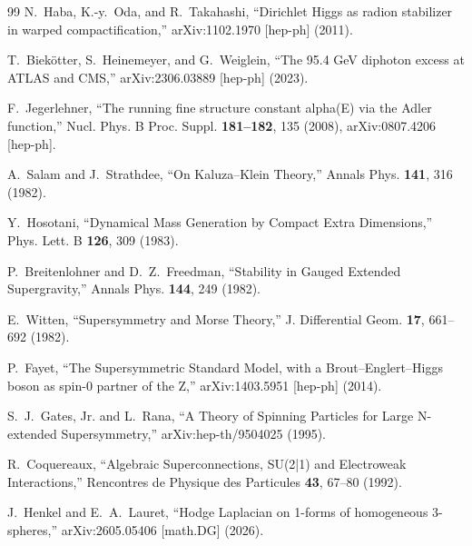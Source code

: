 \begin{thebibliography}{99}
N.~Haba, K.-y.~Oda, and R.~Takahashi, ``Dirichlet Higgs as radion stabilizer in warped compactification,'' arXiv:1102.1970 [hep-ph] (2011).

T.~Biek{\"o}tter, S.~Heinemeyer, and G.~Weiglein, ``The 95.4 GeV diphoton excess at ATLAS and CMS,'' arXiv:2306.03889 [hep-ph] (2023).

F.~Jegerlehner, ``The running fine structure constant alpha(E) via the Adler function,'' Nucl. Phys. B Proc. Suppl. \textbf{181--182}, 135 (2008), arXiv:0807.4206 [hep-ph].

A.~Salam and J.~Strathdee, ``On Kaluza--Klein Theory,'' Annals Phys. \textbf{141}, 316 (1982).

Y.~Hosotani, ``Dynamical Mass Generation by Compact Extra Dimensions,'' Phys. Lett. B \textbf{126}, 309 (1983).

P.~Breitenlohner and D.~Z.~Freedman, ``Stability in Gauged Extended Supergravity,'' Annals Phys. \textbf{144}, 249 (1982).

E.~Witten, ``Supersymmetry and Morse Theory,'' J. Differential Geom. \textbf{17}, 661--692 (1982).

P.~Fayet, ``The Supersymmetric Standard Model, with a Brout--Englert--Higgs boson as spin-0 partner of the Z,'' arXiv:1403.5951 [hep-ph] (2014).

S.~J.~Gates, Jr. and L.~Rana, ``A Theory of Spinning Particles for Large N-extended Supersymmetry,'' arXiv:hep-th/9504025 (1995).

R.~Coquereaux, ``Algebraic Superconnections, SU(2|1) and Electroweak Interactions,'' Rencontres de Physique des Particules \textbf{43}, 67--80 (1992).

J.~Henkel and E.~A.~Lauret, ``Hodge Laplacian on 1-forms of homogeneous 3-spheres,'' arXiv:2605.05406 [math.DG] (2026).

\end{thebibliography}
